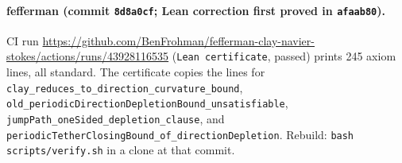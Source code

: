 \documentclass[11pt]{article}
\theoremstyle{plain}
\theoremstyle{definition}
\theoremstyle{remark}
\newcommand{\fefsha}{8d8a0cf}
\begin{document}
\paragraph{fefferman (commit \texttt{\fefsha}; Lean correction first proved in \texttt{afaab80}).}
CI run \url{https://github.com/BenFrohman/fefferman-clay-navier-stokes/actions/runs/43928116535} (\texttt{Lean certificate}, passed) prints 245 axiom lines, all standard. The certificate copies the lines for \texttt{clay\_\hspace{0pt}reduces\_\hspace{0pt}to\_\hspace{0pt}direction\_\hspace{0pt}curvature\_\hspace{0pt}bound}, \texttt{old\_\hspace{0pt}periodicDirectionDepletionBound\_\hspace{0pt}unsatisfiable}, \texttt{jumpPath\_\hspace{0pt}oneSided\_\hspace{0pt}depletion\_\hspace{0pt}clause}, and \texttt{periodicTetherClosingBound\_\hspace{0pt}of\_\hspace{0pt}directionDepletion}. Rebuild: \texttt{bash scripts/verify.sh} in a clone at that commit.
\end{document}
